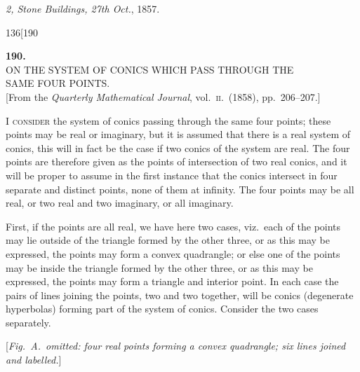 \documentclass[11pt]{article}
\begin{document}
\medskip

\noindent \emph{2, Stone Buildings, 27th Oct.}, 1857.

\newpage

\begin{center}
\small 136\hfill\textsc{}\hfill[190
\end{center}

\bigskip

\begin{center}
{\Large\bfseries 190.}\\[8pt]
{\large ON THE SYSTEM OF CONICS WHICH PASS THROUGH THE\\
SAME FOUR POINTS.}\\[6pt]
\small [From the \emph{Quarterly Mathematical Journal}, vol.~\textsc{ii}.\ (1858), pp.~206--207.]
\end{center}

\bigskip

\noindent \textsc{I consider} the system of conics passing through the same four points; these points may be real or imaginary, but it is assumed that there is a real system of conics, this will in fact be the case if two conics of the system are real. The four points are therefore given as the points of intersection of two real conics, and it will be proper to assume in the first instance that the conics intersect in four separate and distinct points, none of them at infinity. The four points may be all real, or two real and two imaginary, or all imaginary.

First, if the points are all real, we have here two cases, viz.\ each of the points may lie outside of the triangle formed by the other three, or as this may be expressed, the points may form a convex quadrangle; or else one of the points may be inside the triangle formed by the other three, or as this may be expressed, the points may form a triangle and interior point. In each case the pairs of lines joining the points, two and two together, will be conics (degenerate hyperbolas) forming part of the system of conics. Consider the two cases separately.

\medskip

\begin{center}
[\emph{Fig.\ A.\ omitted: four real points forming a convex quadrangle; six lines joined and labelled.}]
\end{center}
\end{document}
